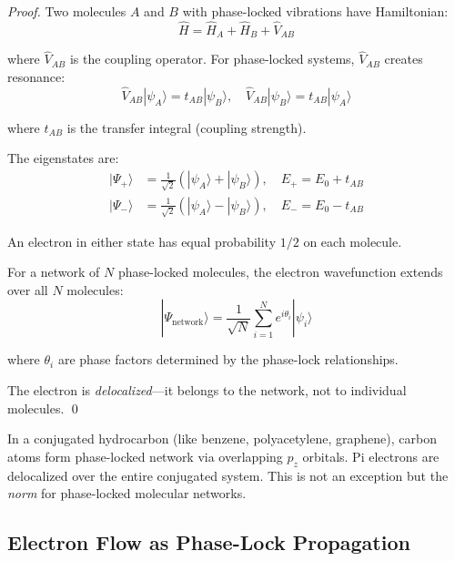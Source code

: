 \begin{proof}
Two molecules $A$ and $B$ with phase-locked vibrations have Hamiltonian:
\begin{equation}
\hat{H} = \hat{H}_A + \hat{H}_B + \hat{V}_{AB}
\end{equation}

where $\hat{V}_{AB}$ is the coupling operator. For phase-locked systems, $\hat{V}_{AB}$ creates resonance:
\begin{equation}
\hat{V}_{AB} |\psi_A\rangle = t_{AB} |\psi_B\rangle, \quad \hat{V}_{AB} |\psi_B\rangle = t_{AB} |\psi_A\rangle
\end{equation}

where $t_{AB}$ is the transfer integral (coupling strength).

The eigenstates are:
\begin{align}
|\Psi_+\rangle &= \frac{1}{\sqrt{2}} (|\psi_A\rangle + |\psi_B\rangle), \quad E_+ = E_0 + t_{AB} \\
|\Psi_-\rangle &= \frac{1}{\sqrt{2}} (|\psi_A\rangle - |\psi_B\rangle), \quad E_- = E_0 - t_{AB}
\end{align}

An electron in either state has equal probability $1/2$ on each molecule.

For a network of $N$ phase-locked molecules, the electron wavefunction extends over all $N$ molecules:
\begin{equation}
|\Psi_{\text{network}}\rangle = \frac{1}{\sqrt{N}} \sum_{i=1}^{N} e^{i\theta_i} |\psi_i\rangle
\end{equation}

where $\theta_i$ are phase factors determined by the phase-lock relationships.

The electron is \textit{delocalized}—it belongs to the network, not to individual molecules. \qed
\end{proof}

\begin{example}
In a conjugated hydrocarbon (like benzene, polyacetylene, graphene), carbon atoms form phase-locked network via overlapping $p_z$ orbitals. Pi electrons are delocalized over the entire conjugated system. This is not an exception but the \textit{norm} for phase-locked molecular networks.
\end{example}

\subsection{Electron Flow as Phase-Lock Propagation}

